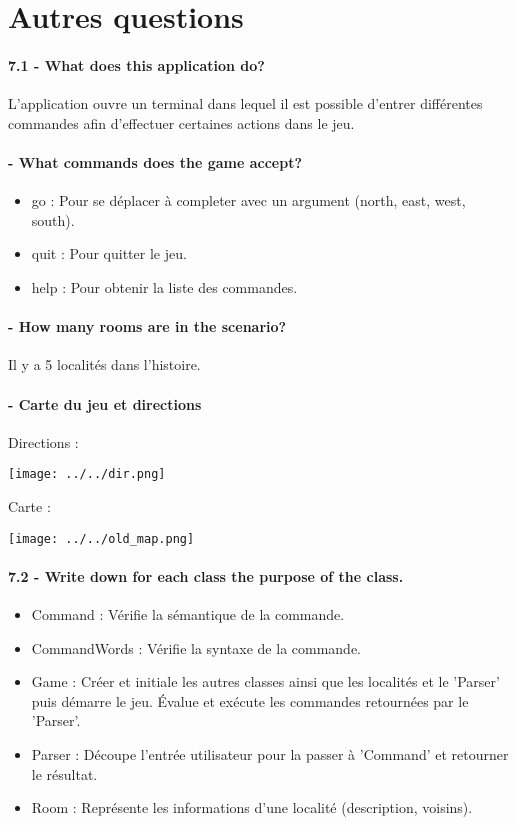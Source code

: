 \documentclass[11pt,a4paper]{report}
\begin{document}
\section{Autres questions}
\paragraph{7.1 - What does this application do?}
L'application ouvre un terminal dans lequel il est possible d'entrer différentes commandes afin d'effectuer certaines actions dans le jeu.
\paragraph{    - What commands does the game accept?}
\begin{itemize}
\item go	:	Pour se déplacer à completer avec un argument (north, east, west, south).
\item quit	:	Pour quitter le jeu.
\item help	:	Pour obtenir la liste des commandes.
\end{itemize}
\paragraph{    - How many rooms are in the scenario?}
Il y a 5 localités dans l'histoire.
\paragraph{    - Carte du jeu et directions}
Directions :\\
\centerline{\texttt{[image: ../../dir.png]}}
Carte :\\
\centerline{\texttt{[image: ../../old\_map.png]}}
\paragraph{7.2 - Write down for each class the purpose of the class.}
\begin{itemize}
\item Command				:		Vérifie la sémantique de la commande.
\item CommandWords		:		Vérifie la syntaxe de la commande.
\item Game				:		Créer et initiale les autres classes ainsi que les localités et le 'Parser' puis démarre le jeu. Évalue et exécute les commandes retournées par le 'Parser'.
\item Parser				:		Découpe l'entrée utilisateur pour la passer à 'Command' et retourner le résultat.
\item Room				:		Représente les informations d'une localité (description, voisins).

\end{itemize}
\end{document}
